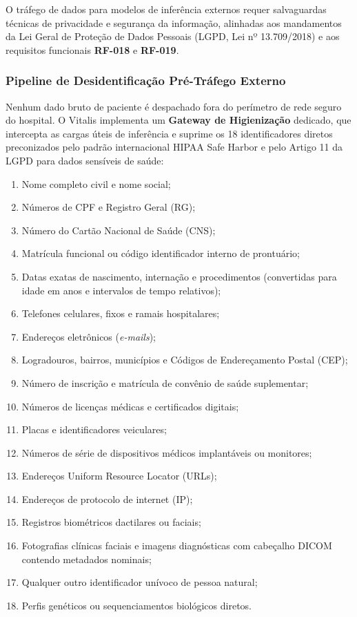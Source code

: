 O tráfego de dados para modelos de inferência externos requer salvaguardas técnicas de privacidade e segurança da informação, alinhadas aos mandamentos da Lei Geral de Proteção de Dados Pessoais (LGPD, Lei nº 13.709/2018) \cite{brasil_lgpd:2018} e aos requisitos funcionais \textbf{RF-018} e \textbf{RF-019}.

\subsubsection{Pipeline de Desidentificação Pré-Tráfego Externo}
Nenhum dado bruto de paciente é despachado fora do perímetro de rede seguro do hospital. O Vitalis implementa um \textbf{Gateway de Higienização} dedicado, que intercepta as cargas úteis de inferência e suprime os 18 identificadores diretos preconizados pelo padrão internacional HIPAA Safe Harbor e pelo Artigo 11 da LGPD para dados sensíveis de saúde:
\begin{enumerate}[noitemsep]
    \item Nome completo civil e nome social;
    \item Números de CPF e Registro Geral (RG);
    \item Número do Cartão Nacional de Saúde (CNS);
    \item Matrícula funcional ou código identificador interno de prontuário;
    \item Datas exatas de nascimento, internação e procedimentos (convertidas para idade em anos e intervalos de tempo relativos);
    \item Telefones celulares, fixos e ramais hospitalares;
    \item Endereços eletrônicos (\textit{e-mails});
    \item Logradouros, bairros, municípios e Códigos de Endereçamento Postal (CEP);
    \item Número de inscrição e matrícula de convênio de saúde suplementar;
    \item Números de licenças médicas e certificados digitais;
    \item Placas e identificadores veiculares;
    \item Números de série de dispositivos médicos implantáveis ou monitores;
    \item Endereços Uniform Resource Locator (URLs);
    \item Endereços de protocolo de internet (IP);
    \item Registros biométricos dactilares ou faciais;
    \item Fotografias clínicas faciais e imagens diagnósticas com cabeçalho DICOM contendo metadados nominais;
    \item Qualquer outro identificador unívoco de pessoa natural;
    \item Perfis genéticos ou sequenciamentos biológicos diretos.
\end{enumerate}


